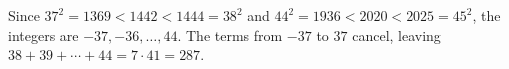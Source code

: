 Since $37^2=1369<1442<1444=38^2$ and $44^2=1936<2020<2025=45^2$, the integers are $-37,-36,\dots,44$. The terms from $-37$ to $37$ cancel, leaving $38+39+\cdots+44=7\cdot41=\boxed{287}$.
